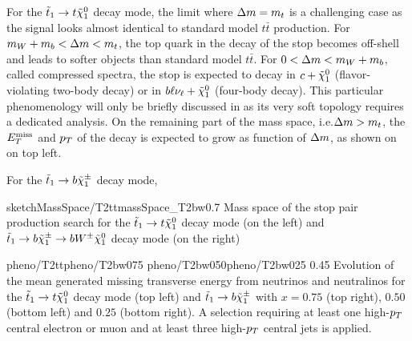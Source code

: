         For the $\tilde{t}_1 \rightarrow t \tilde{\chi}_1^0$ decay mode, the limit where
        $\Delta m = m_{t}$ is a challenging case as the signal looks almost identical
        to standard model $t\bar{t}$ production. For $m_{W} + m_{b} < \Delta m < m_{t}$,
        the top quark in the decay of the stop becomes off-shell and leads to softer objects
        than standard model $t\bar{t}$. For $0 < \Delta m < m_{W} + m_{b}$, called
        compressed spectra, the stop is expected to decay in $c+\tilde{\chi}_1^0$
        (flavor-violating two-body decay) or in $b\ell\nu_\ell+\tilde{\chi}_1^0$ (four-body
        decay). This particular phenomenology will only be briefly discussed in
         as its very soft topology requires a
        dedicated analysis. On the remaining part of the mass space, i.e.$\Delta m > m_{t}$,
        the $E_T^\text{miss}$ and $p_T$ of the decay is expected to grow as function of $\Delta m$,
        as shown on  on top left.

        For the $\tilde{t}_1 \rightarrow b \tilde{\chi}_1^\pm$ decay mode, 

                     {sketchMassSpace/T2tt}{massSpace_T2bw}{0.7}
                     {Mass space of the stop pair production search for the $\tilde{t}_1
                     \rightarrow t \tilde{\chi}_1^0$ decay mode (on the left) and $\tilde{t}_1
                     \rightarrow b \tilde{\chi}_1^\pm \rightarrow b W^{\pm} \tilde{\chi}_1^0 $ decay
                     mode (on the right) }

                     {pheno/T2tt}{pheno/T2bw075}
                     {pheno/T2bw050}{pheno/T2bw025}
                     {0.45}
                     {Evolution of the mean generated missing transverse energy from neutrinos
                     and neutralinos for the $\tilde{t}_1 \rightarrow t \tilde{\chi}_1^0$
                     decay mode (top left) and $\tilde{t}_1 \rightarrow b \tilde{\chi}_1^\pm$ with
                     $x = 0.75$ (top right), $0.50$ (bottom left) and $0.25$ (bottom right).
                     A selection requiring at least one high-$p_T$ central
                     electron or muon and at least three high-$p_T$ central jets is applied.}

